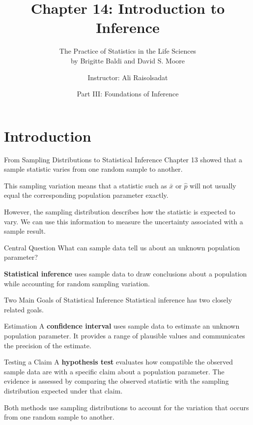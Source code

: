 \documentclass[aspectratio=169]{beamer}
\title[Chapter 14: Introduction to Inference]{\textbf{Chapter 14: Introduction to Inference}}
\subtitle{The Practice of Statistics in the Life Sciences \\ by Brigitte Baldi and David S. Moore}
\author{Instructor: Ali Raisolsadat}
\date{Part III: Foundations of Inference}
\begin{document}
\section{Introduction}

\begin{frame}
  \titlepage
\end{frame}

\begin{frame}{From Sampling Distributions to Statistical Inference}
Chapter 13 showed that a sample statistic varies from one random sample to another.
\vspace{0.2cm}

This sampling variation means that a statistic such as $\bar{x}$ or $\hat{p}$ will not usually equal the corresponding population parameter exactly.

\vspace{0.2cm}
However, the sampling distribution describes how the statistic is expected to vary. We can use this information to measure the uncertainty associated with a sample result.

\vspace{0.25cm}
\begin{block}{Central Question}
\centering
\large
What can sample data tell us about an unknown population parameter?
\end{block}

\vspace{0.15cm}
\textbf{Statistical inference} uses sample data to draw conclusions about a population while accounting for random sampling variation.
\end{frame}


\begin{frame}{Two Main Goals of Statistical Inference}
Statistical inference has two closely related goals.

\vspace{0.2cm}
\begin{block}{Estimation}
A \textbf{confidence interval} uses sample data to estimate an unknown population parameter. It provides a range of plausible values and communicates the precision of the estimate.
\end{block}

\vspace{0.15cm}
\begin{block}{Testing a Claim}
A \textbf{hypothesis test} evaluates how compatible the observed sample data are with a specific claim about a population parameter. The evidence is assessed by comparing the observed statistic with the sampling distribution expected under that claim.
\end{block}

\vspace{0.15cm}
Both methods use sampling distributions to account for the variation that occurs from one random sample to another.
\end{frame}
\end{document}
